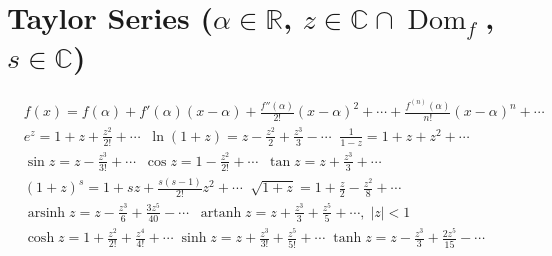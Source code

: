 \section*{Taylor Series \normalfont\scriptsize{($\alpha\!\in\!\mathbb{R}$, $z\!\in\!\mathbb{C}\!\cap\!\operatorname{Dom}_f$, $s\!\in\!\mathbb{C}$)}}
\begin{align*}
&f(x)\!=\!f(\alpha)\!+\!f'(\alpha)(x\!-\!\alpha)\!+\!\frac{f''(\alpha)}{2!}(x\!-\!\alpha)^2\!+\!\cdots\!+\!\frac{f^{(n)}(\alpha)}{n!}(x\!-\!\alpha)^n\!+\!\cdots \\
&e^z\!=\!1\!+\!z\!+\!\frac{z^2}{2!}\!+\!\cdots \;\; \ln(1\!+\!z)\!=\!z\!-\!\frac{z^2}{2}\!+\!\frac{z^3}{3}\!-\!\cdots \;\; \frac{1}{1\!-\!z}\!=\!1\!+\!z\!+\!z^2\!+\!\cdots \\
&\sin z\!=\!z\!-\!\frac{z^3}{3!}\!+\!\cdots \;\; \cos z\!=\!1\!-\!\frac{z^2}{2!}\!+\!\cdots \;\; \tan z\!=\!z\!+\!\frac{z^3}{3}\!+\!\cdots \\
&(1\!+\!z)^s\!=\!1\!+\!sz\!+\!\frac{s(s\!-\!1)}{2!}z^2\!+\!\cdots \;\; \sqrt{1\!+\!z}\!=\!1\!+\!\frac{z}{2}\!-\!\frac{z^2}{8}\!+\!\cdots \\
&\operatorname{arsinh}z\!=\!z\!-\!\frac{z^3}{6}\!+\!\frac{3z^5}{40}\!-\!\cdots \;\; \operatorname{artanh}z\!=\!z\!+\!\frac{z^3}{3}\!+\!\frac{z^5}{5}\!+\!\cdots,\;|z|\!<\!1 \\
&\cosh\!z\!=\!1\!+\!\frac{z^2}{2!}\!+\!\frac{z^4}{4!}\!\!+\!\cdots \; \sinh \!z\!=\!z\!+\!\frac{z^3}{3!}\!+\!\frac{z^5}{5!}\!\!+\!\cdots \; \tanh\!z\!=\!z\!-\!\frac{z^3}{3}\!+\!\frac{2z^5}{15}\!\!-\!\!\cdots
\end{align*}